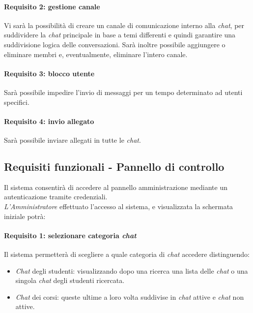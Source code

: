 \paragraph{Requisito 2: gestione canale\\}
Vi sarà la possibilità di creare un canale di comunicazione interno alla \emph{chat}, per suddividere la \emph{chat} principale in base a temi differenti e quindi garantire una suddivisione logica delle conversazioni. Sarà inoltre possibile aggiungere o eliminare membri e, eventualmente, eliminare l’intero canale.

\paragraph{Requisito 3: blocco utente\\}
Sarà possibile impedire l’invio di messaggi per un tempo determinato ad utenti specifici.

\paragraph{Requisito 4: invio allegato\\}
Sarà possibile inviare allegati in tutte le \emph{chat}.


\subsection{Requisiti funzionali - Pannello di controllo}
Il sistema consentirà di accedere al pannello amministrazione mediante un autenticazione tramite credenziali.\\
\emph{L’Amministratore} effettuato l’accesso al sistema, e visualizzata la schermata iniziale potrà:

\paragraph{Requisito 1: selezionare categoria \emph{chat}\\}
Il sistema permetterà di scegliere a quale categoria di \emph{chat} accedere distinguendo: 
\begin{itemize}
\item \emph{Chat} degli studenti: visualizzando dopo una ricerca una lista delle \emph{chat} o una singola \emph{chat} degli studenti ricercata.
\item \emph{Chat} dei corsi: queste ultime a loro volta suddivise in \emph{chat} attive e \emph{chat} non attive.
\end{itemize}

